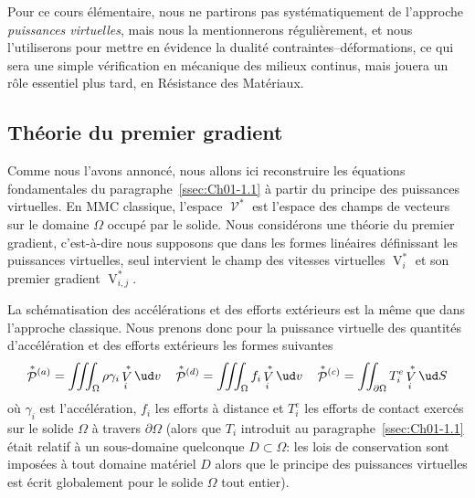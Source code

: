 Pour ce cours élémentaire, nous ne partirons pas systématiquement de l'approche \emph{puissances virtuelles}, mais nous la mentionnerons régulièrement, et nous l'utiliserons pour mettre en évidence la dualité contraintes--déformations, ce qui sera une simple vérification en mécanique des milieux continus, mais jouera un rôle essentiel plus tard, en Résistance des Matériaux.

\subsection{Théorie du premier gradient} \label{ssec:Ch01-2.3}
Comme nous l'avons annoncé, nous allons ici reconstruire les équations fondamentales du paragraphe~\ref{ssec:Ch01-1.1} à partir du principe des puissances virtuelles.
En MMC classique, l'espace $\mathop{\mathcal{V}}^{\ast}$ est l'espace des champs de vecteurs sur le domaine $\Omega$ occupé par le solide.
Nous considérons une théorie du premier gradient, c'est-à-dire nous supposons que dans les formes linéaires définissant les puissances virtuelles, seul intervient le champ des vitesses virtuelles $\mathop{V}^{\ast}_i$ et son premier gradient $\mathop{V}^{\ast}_{i,j}$.

La schématisation des accélérations et des efforts extérieurs est la même que dans l'approche classique.
Nous prenons donc pour la puissance virtuelle des quantités d'accélération et des efforts extérieurs les formes suivantes
\begin{equation}
    \mathop{\mathcal{P}}^{\ast}{\!}^{(a)} = \iiint_{\Omega} \rho \gamma_i \mathop{V}^{\ast}_i \ud v \quad
    \mathop{\mathcal{P}}^{\ast}{\!}^{(d)} = \iiint_{\Omega} f_i \mathop{V}^{\ast}_i \ud v \quad
    \mathop{\mathcal{P}}^{\ast}{\!}^{(c)} = \iint_{\partial\Omega} T_i^e \mathop{V}^{\ast}_i \ud S
    \label{eq:Ch01-33}
\end{equation}
où $\gamma_i$ est l'accélération, $f_i$ les efforts à distance et $T_i^e$ les efforts de contact exercés sur le solide $\Omega$ à travers $\partial \Omega$ (alors que $T_i$ introduit au paragraphe~\ref{ssec:Ch01-1.1} était relatif à un sous-domaine quelconque $D\subset \Omega$: les lois de conservation sont imposées à tout domaine matériel $D$ alors que le principe des puissances virtuelles est écrit globalement pour le solide $\Omega$ tout entier).

